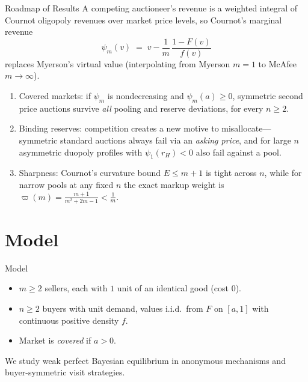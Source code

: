 \documentclass[11pt,aspectratio=169]{beamer}
\def\meditem{\smallskip\item}
\begin{document}
\begin{frame}{Roadmap of Results}
A competing auctioneer's revenue is a weighted integral of \alert{Cournot oligopoly revenues} over market price levels, so Cournot's marginal revenue
\[
\psi_m(v) \;=\; v - \frac{1}{m}\,\frac{1-F(v)}{f(v)}
\]
replaces Myerson's virtual value (interpolating from Myerson $m=1$ to McAfee $m\to\infty$).

\medskip{}
\begin{enumerate}
\item \alert{Covered markets}: if $\psi_m$ is nondecreasing and $\psi_m(a)\ge 0$, symmetric second price auctions survive \emph{all} pooling and reserve deviations, for every $n\ge 2$.
\meditem \alert{Binding reserves}: competition creates a new motive to misallocate---symmetric standard auctions always fail via an \emph{asking price}, and for large $n$ asymmetric duopoly profiles with $\psi_1(r_H)<0$ also fail against a pool.
\meditem \alert{Sharpness}: Cournot's curvature bound $E\le m+1$ is tight across $n$, while for narrow pools at any fixed $n$ the exact markup weight is $\varpi(m)=\frac{m+1}{m^2+2m-1}<\frac1m$.
\end{enumerate}
\end{frame}

\section{Model}

\begin{frame}{Model}
\begin{itemize}
\item $m\ge 2$ sellers, each with $1$ unit of an identical good (cost $0$).
\item $n\ge 2$ buyers with unit demand, values i.i.d.\ from $F$ on $[a,1]$ with continuous positive density $f$.
\item Market is \emph{covered} if $a>0$.
\end{itemize}

\bigskip
\centering
{}

\raggedright\bigskip
We study weak perfect Bayesian equilibrium in anonymous mechanisms and buyer-symmetric visit strategies.
\end{frame}
\end{document}
